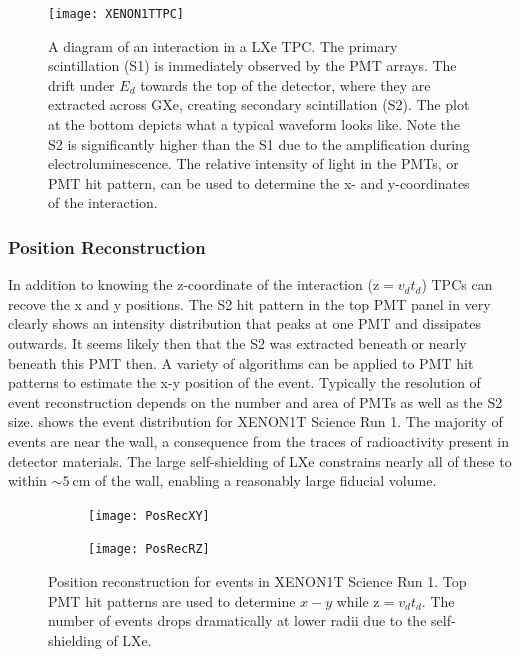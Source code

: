 \begin{figure}
\centering
\texttt{[image: XENON1TTPC]}
\caption{A diagram of an interaction in a LXe TPC.  The primary scintillation (S1) is immediately
observed by the PMT arrays.  The \electron drift under $E_{d}$ towards the top of the detector, where they are extracted across GXe,
creating secondary scintillation (S2).  The plot at the bottom depicts what a typical waveform looks like.  Note the S2 is significantly
higher than the S1 due to the amplification during electroluminescence.  The relative intensity of light in the PMTs, or PMT hit
pattern, can be used to determine the x- and y-coordinates of the interaction.}
\label{fig:tpcs_signal_tpc}
\end{figure}



\subsubsection{Position Reconstruction}
\label{subsubsec:tpcs_signals_posrec}
In addition to knowing the z-coordinate of the interaction ($\mathrm{z} = v_{d} t_{d}$) TPCs can recove the x and y positions.  The S2
hit pattern in the top PMT panel in  very clearly shows an intensity distribution that peaks at one
PMT and dissipates outwards.  It seems likely then that the S2 was extracted beneath or nearly beneath this PMT then.  A variety of
algorithms can be applied to PMT hit patterns to estimate the x-y position of the event.  Typically the resolution of event
reconstruction depends on the number and area of PMTs as well as the S2 size.   shows the event
distribution for XENON1T Science Run 1.  The majority of events are near the wall, a consequence from the
traces of radioactivity present in detector materials.  The large self-shielding of LXe constrains nearly all of these to within
${\sim} 5\ \mathrm{cm}$ of the wall, enabling a reasonably large fiducial volume.

\begin{figure}
    \centering
    \begin{subfigure}[t]{0.45\textwidth}
        \centering
        \texttt{[image: PosRecXY]}
    \end{subfigure}%
    \begin{subfigure}[t]{0.45\textwidth}
        \centering
        \texttt{[image: PosRecRZ]}
    \end{subfigure}
    \caption{Position reconstruction for events in XENON1T Science Run 1.  Top PMT hit patterns are used to determine $x-y$ while
    $\mathrm{z} = v_{d} t_{d}$.  The number of events drops dramatically at lower radii due to the self-shielding of LXe.}
	\label{fig:tpcs_signals_posrec}
\end{figure}



